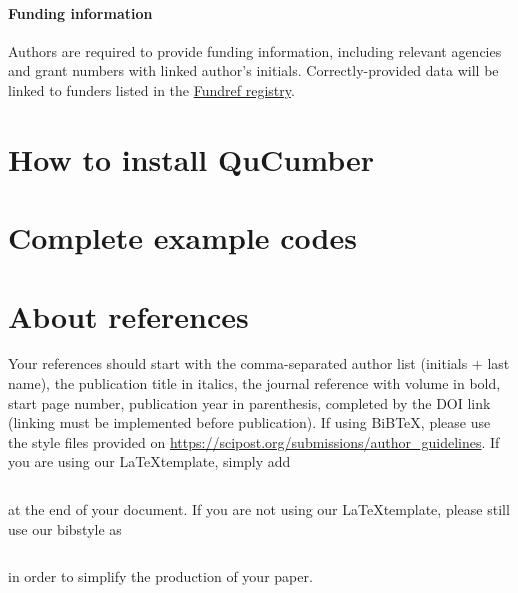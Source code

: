 \documentclass[submission, Phys]{SciPost}
\begin{document}
\paragraph{Funding information}
Authors are required to provide funding information, including relevant agencies and grant numbers with linked author's initials. Correctly-provided data will be linked to funders listed in the \href{https://www.crossref.org/services/funder-registry/}{\sf Fundref registry}.


\begin{appendix}

\section{How to install QuCumber}

\section{Complete example codes}

\section{About references}
Your references should start with the comma-separated author list (initials + last name), the publication title in italics, the journal reference with volume in bold, start page number, publication year in parenthesis, completed by the DOI link (linking must be implemented before publication). If using BiBTeX, please use the style files provided  on \url{https://scipost.org/submissions/author_guidelines}. If you are using our \LaTeX template, simply add
\begin{verbatim}

\end{verbatim}
at the end of your document. If you are not using our \LaTeX template, please still use our bibstyle as
\begin{verbatim}

\end{verbatim}
in order to simplify the production of your paper.
\end{appendix}






\nolinenumbers
\end{document}
